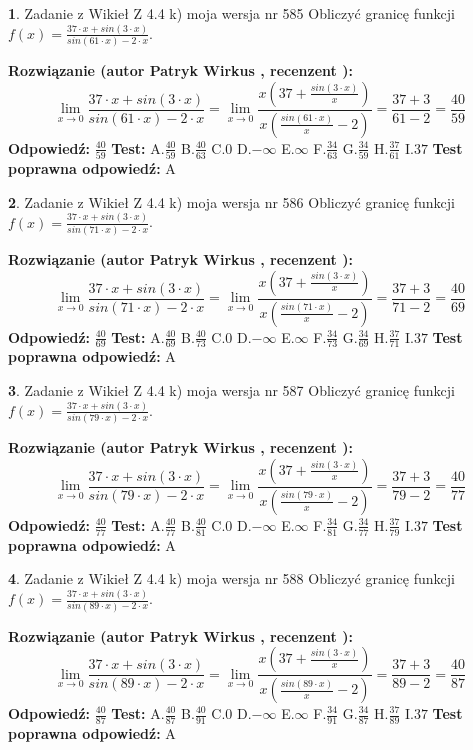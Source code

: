 \documentclass[12pt, a4paper]{article}
\theoremstyle{definition} %
\newtheorem{zad}{}
\newcommand{\zadStart}[1]{\begin{zad}#1\newline}
\newcommand{\zadStop}{\end{zad}}
\newcommand{\rozwStart}[2]{\noindent \textbf{Rozwiązanie (autor #1 , recenzent #2): }\newline}
\newcommand{\rozwStop}{\newline}
\newcommand{\odpStart}{\noindent \textbf{Odpowiedź:}\newline}
\newcommand{\odpStop}{\newline}
\newcommand{\testStart}{\noindent \textbf{Test:}\newline}
\newcommand{\testStop}{\newline}
\newcommand{\kluczStart}{\noindent \textbf{Test poprawna odpowiedź:}\newline}
\newcommand{\kluczStop}{\newline}
\begin{document}
\zadStart{Zadanie z Wikieł Z 4.4 k) moja wersja nr 585}
Obliczyć granicę funkcji $f(x)=\frac{37\cdot x +sin(3\cdot x)}{sin(61\cdot x) -2\cdot x}$.
\zadStop
\rozwStart{Patryk Wirkus}{}
$$\lim\limits_{x\to 0}\frac{37\cdot x +sin(3\cdot x)}{sin(61\cdot x) -2\cdot x}
=\lim\limits_{x\to 0}\frac{x(37+\frac{sin(3\cdot x)}{x})}{x(\frac{sin(61\cdot x)}{x}-2)}
=\frac{37+3}{61-2} = \frac{40}{59}$$
\rozwStop
\odpStart
$\frac{40}{59}$
\odpStop
\testStart
A.$\frac{40}{59}$
B.$\frac{40}{63}$
C.$0$
D.$-\infty$
E.$\infty$
F.$\frac{34}{63}$
G.$\frac{34}{59}$
H.$\frac{37}{61}$
I.$37$
\testStop
\kluczStart
A
\kluczStop



\zadStart{Zadanie z Wikieł Z 4.4 k) moja wersja nr 586}
Obliczyć granicę funkcji $f(x)=\frac{37\cdot x +sin(3\cdot x)}{sin(71\cdot x) -2\cdot x}$.
\zadStop
\rozwStart{Patryk Wirkus}{}
$$\lim\limits_{x\to 0}\frac{37\cdot x +sin(3\cdot x)}{sin(71\cdot x) -2\cdot x}
=\lim\limits_{x\to 0}\frac{x(37+\frac{sin(3\cdot x)}{x})}{x(\frac{sin(71\cdot x)}{x}-2)}
=\frac{37+3}{71-2} = \frac{40}{69}$$
\rozwStop
\odpStart
$\frac{40}{69}$
\odpStop
\testStart
A.$\frac{40}{69}$
B.$\frac{40}{73}$
C.$0$
D.$-\infty$
E.$\infty$
F.$\frac{34}{73}$
G.$\frac{34}{69}$
H.$\frac{37}{71}$
I.$37$
\testStop
\kluczStart
A
\kluczStop



\zadStart{Zadanie z Wikieł Z 4.4 k) moja wersja nr 587}
Obliczyć granicę funkcji $f(x)=\frac{37\cdot x +sin(3\cdot x)}{sin(79\cdot x) -2\cdot x}$.
\zadStop
\rozwStart{Patryk Wirkus}{}
$$\lim\limits_{x\to 0}\frac{37\cdot x +sin(3\cdot x)}{sin(79\cdot x) -2\cdot x}
=\lim\limits_{x\to 0}\frac{x(37+\frac{sin(3\cdot x)}{x})}{x(\frac{sin(79\cdot x)}{x}-2)}
=\frac{37+3}{79-2} = \frac{40}{77}$$
\rozwStop
\odpStart
$\frac{40}{77}$
\odpStop
\testStart
A.$\frac{40}{77}$
B.$\frac{40}{81}$
C.$0$
D.$-\infty$
E.$\infty$
F.$\frac{34}{81}$
G.$\frac{34}{77}$
H.$\frac{37}{79}$
I.$37$
\testStop
\kluczStart
A
\kluczStop



\zadStart{Zadanie z Wikieł Z 4.4 k) moja wersja nr 588}
Obliczyć granicę funkcji $f(x)=\frac{37\cdot x +sin(3\cdot x)}{sin(89\cdot x) -2\cdot x}$.
\zadStop
\rozwStart{Patryk Wirkus}{}
$$\lim\limits_{x\to 0}\frac{37\cdot x +sin(3\cdot x)}{sin(89\cdot x) -2\cdot x}
=\lim\limits_{x\to 0}\frac{x(37+\frac{sin(3\cdot x)}{x})}{x(\frac{sin(89\cdot x)}{x}-2)}
=\frac{37+3}{89-2} = \frac{40}{87}$$
\rozwStop
\odpStart
$\frac{40}{87}$
\odpStop
\testStart
A.$\frac{40}{87}$
B.$\frac{40}{91}$
C.$0$
D.$-\infty$
E.$\infty$
F.$\frac{34}{91}$
G.$\frac{34}{87}$
H.$\frac{37}{89}$
I.$37$
\testStop
\kluczStart
A
\kluczStop
\end{document}
